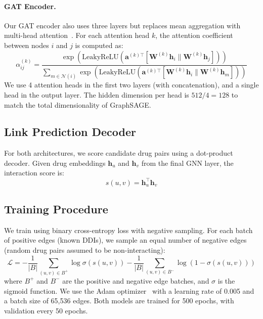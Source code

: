 \documentclass{article}
\begin{document}
\paragraph{GAT Encoder.}
Our GAT encoder also uses three layers but replaces mean aggregation with multi-head attention~\citep{velickovic2018graph}. For each attention head $k$, the attention coefficient between nodes $i$ and $j$ is computed as:
\begin{equation}
    \alpha_{ij}^{(k)} = \frac{\exp\left(\text{LeakyReLU}\left(\mathbf{a}^{(k)\top} [\mathbf{W}^{(k)}\mathbf{h}_i \| \mathbf{W}^{(k)}\mathbf{h}_j]\right)\right)}{\sum_{m \in \mathcal{N}(i)} \exp\left(\text{LeakyReLU}\left(\mathbf{a}^{(k)\top} [\mathbf{W}^{(k)}\mathbf{h}_i \| \mathbf{W}^{(k)}\mathbf{h}_m]\right)\right)}
\end{equation}
We use 4 attention heads in the first two layers (with concatenation), and a single head in the output layer. The hidden dimension per head is $512 / 4 = 128$ to match the total dimensionality of GraphSAGE.

\subsection{Link Prediction Decoder}

For both architectures, we score candidate drug pairs using a dot-product decoder. Given drug embeddings $\mathbf{h}_u$ and $\mathbf{h}_v$ from the final GNN layer, the interaction score is:
\begin{equation}
    s(u, v) = \mathbf{h}_u^\top \mathbf{h}_v
\end{equation}

\subsection{Training Procedure}

We train using binary cross-entropy loss with negative sampling. For each batch of positive edges (known DDIs), we sample an equal number of negative edges (random drug pairs assumed to be non-interacting):
\begin{equation}
    \mathcal{L} = -\frac{1}{|B|} \sum_{(u,v) \in B^+} \log \sigma(s(u,v)) - \frac{1}{|B|} \sum_{(u,v) \in B^-} \log (1 - \sigma(s(u,v)))
\end{equation}
where $B^+$ and $B^-$ are the positive and negative edge batches, and $\sigma$ is the sigmoid function. We use the Adam optimizer~\citep{kingma2015adam} with a learning rate of 0.005 and a batch size of 65,536 edges. Both models are trained for 500 epochs, with validation every 50 epochs.
\end{document}
